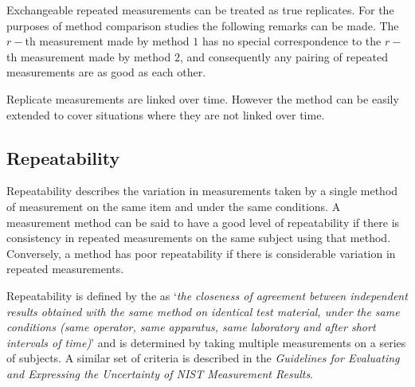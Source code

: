 \documentclass[12pt, a4paper]{report}
\theoremstyle{plain}
\theoremstyle{definition}
\theoremstyle{remark}
\begin{document}
	Exchangeable repeated measurements can be treated as true replicates. For the purposes of method comparison studies the following remarks can be made. The $r-$th measurement made by method $1$ has no special correspondence to the $r-$th measurement made by method $2$, and consequently any pairing of repeated measurements are as good as each other.
	
	
	
	
	Replicate measurements are linked over time. However the method can be easily extended to cover situations where they are not linked over time.
	
	
	
	
	
	
	
	
	
	

	
	
	
	\subsection{Repeatability}
	Repeatability describes the variation in measurements taken by a single method of measurement on the same item and under the same conditions. A measurement method can be said to have a good level of repeatability if there is consistency in repeated measurements on the same subject using that method. Conversely, a method has poor repeatability if there is considerable variation in repeated measurements.
		
		Repeatability is defined by the \citet{IUPAC} as `\textit{the closeness of agreement between independent results obtained with the same method on identical test material, under the same conditions (same
			operator, same apparatus, same laboratory and after short intervals of time)}'  and is determined by taking multiple measurements on a series of subjects.	A similar set of criteria is described in the \textit{Guidelines for Evaluating and Expressing the Uncertainty of NIST Measurement Results}.
%		
\end{document}
